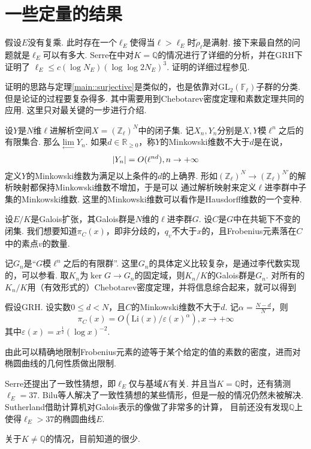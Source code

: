 \chapter{一些定量的结果}

假设$E$没有复乘. 此时存在一个$\ell_E$使得当$\ell>\ell_E$时$\tilde{\rho}_{\ell}$是满射.
接下来最自然的问题就是$\ell_{E}$可以有多大.
Serre在\parencite{serre1981quelques}中对$K=\mathbb{Q}$的情况进行了详细的分析，并在GRH下证明了
$\ell_E \leq c(\log N_E) (\log\log 2N_E)^3$. 证明的详细过程参见\parencite[][p. 196]{serre1981quelques}.

证明的思路与定理\ref{main::surjective}是类似的，也是依靠对$\mathrm{GL}_2(\mathbb{F}_{\ell})$子群的分类.
但是论证的过程要复杂得多.
其中需要用到Chebotarev密度定理和素数定理共同的应用.
这里只对最关键的一步进行介绍.

设$Y$是$N$维$\ell$进解析空间$X = (\mathbb{Z}_{\ell})^N$中的闭子集.
记$X_n,Y_n$分别是$X,Y$模$\ell^n$之后的有限集合.
那么$\lim\limits_{\longleftarrow} Y_n$.
如果$d\in \mathbb{R}_{\geq 0}$，称$Y$的Minkowski维数不大于$d$是在说，
\begin{equation}
    \left|Y_n\right| = O(\ell^{nd}),n\to +\infty
\end{equation}
定义$Y$的Minkowski维数为满足以上条件的$d$的上确界.
形如$(\mathbb{Z}_{\ell})^{N}\to (\mathbb{Z}_{\ell})^{N'}$的解析映射都保持Minkowski维数不增加，于是可以
通过解析映射来定义$\ell$进李群中子集的Minkowski维数.
这里的Minkowski维数可以看作是Hausdorff维数的一个变种.

设$E/K$是Galois扩张，其Galois群是$N$维的$\ell$进李群$G$. 设$C$是$G$中在共轭下不变的闭集.
我们想要知道$\pi_C(x)$，即非分歧的，$q_v$不大于$x$的，且Frobenius元素落在$C$中的素点$v$的数量.

记$G_n$是“$G$模$\ell^n$之后的有限群”.
这里$G_n$的具体定义比较复杂，是通过李代数实现的，可以参看\parencite[][p. 151]{serre1981quelques}.
取$K_n$为$\ker G\to G_n$的固定域，则$K_n/K$的Galois群是$G_n$.
对所有的$K_n/K$用（有效形式的）Chebotarev密度定理，并将信息综合起来，就可以得到
\begin{cthm}
    假设GRH.
    设实数$0\leq d<N$，且$C$的Minkowski维数不大于$d$.
    记$\alpha=\frac{N-d}{N}$，则
    \begin{equation}
        \pi_C(x) = O(\mathrm{Li}(x)/\varepsilon(x)^{\alpha}), x\to +\infty
    \end{equation}
    其中$\varepsilon(x) = x^{\frac{1}{2}} (\log x)^{-2}$.
\end{cthm}

由此可以精确地限制Frobenius元素的迹等于某个给定的值的素数的密度，进而对椭圆曲线的几何性质做出限制.

Serre还提出了一致性猜想，即$\ell_{E}$仅与基域$K$有关. 并且当$K = \mathbb{Q}$时，还有猜测$\ell_{E} = 37$.
Bilu等人解决了一致性猜想的某些情形\parencite{bilu2011serre}，但是一般的情况仍然未被解决.
Sutherland\parencite{sutherland}借助计算机对Galois表示的像做了非常多的计算，
目前还没有发现$\mathbb{Q}$上使得$\ell_{E}>37$的椭圆曲线$E$.

关于$K\neq \mathbb{Q}$的情况，目前知道的很少.
